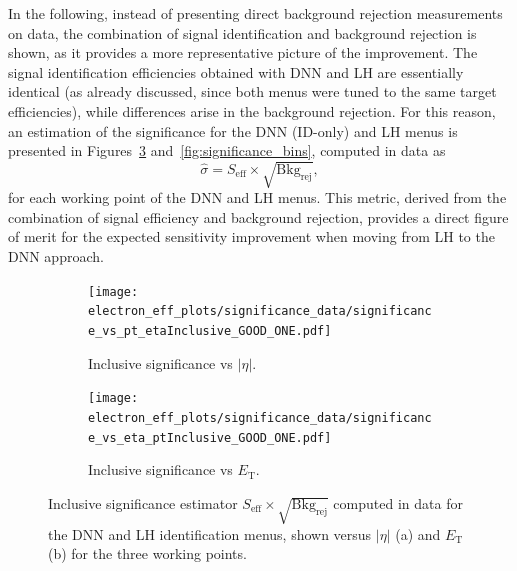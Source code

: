 In the following, instead of presenting direct background rejection measurements on data, 
the combination of signal identification and background rejection is shown, 
as it provides a more representative picture of the improvement. 
The signal identification efficiencies obtained with DNN and LH are essentially identical 
(as already discussed, since both menus were tuned to the same target efficiencies), 
while differences arise in the background rejection. 
For this reason, an estimation of the significance for the DNN (ID-only) and LH menus is presented in Figures~\ref{fig:significance_inclusive} and~\ref{fig:significance_bins}, computed in data as
\begin{equation}
\hat{\sigma} = S_{\mathrm{eff}} \times \sqrt{\mathrm{Bkg}_{\mathrm{rej}}},
\end{equation}
for each working point of the DNN and LH menus. This metric, derived from the combination of signal efficiency and background rejection, provides a direct figure of merit for the expected sensitivity improvement when moving from LH to the DNN approach.


\begin{figure}[htbp]
  \centering

  \begin{subfigure}{0.48\textwidth}
    \centering
    \texttt{[image: electron\_eff\_plots/significance\_data/significance\_vs\_pt\_etaInclusive\_GOOD\_ONE.pdf]}
    \caption{\small{Inclusive significance vs $|\eta|$.}}
    \label{fig:significance_inclusive_eta}
  \end{subfigure}\hfill
  \begin{subfigure}{0.48\textwidth}
    \centering
    \texttt{[image: electron\_eff\_plots/significance\_data/significance\_vs\_eta\_ptInclusive\_GOOD\_ONE.pdf]}
    \caption{\small{Inclusive significance vs $E_{\mathrm{T}}$.}}
    \label{fig:significance_inclusive_pt}
  \end{subfigure}

  \caption{Inclusive significance estimator $S_{\mathrm{eff}} \times \sqrt{\mathrm{Bkg}_{\mathrm{rej}}}$ 
  computed in data for the DNN and LH identification menus, shown versus $|\eta|$ (a) 
  and $E_{\mathrm{T}}$ (b) for the three working points.}
  \label{fig:significance_inclusive}
\end{figure}


